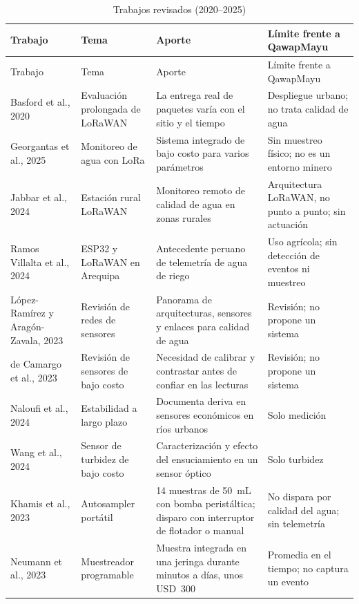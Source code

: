 {\small
\renewcommand{\arraystretch}{1.12}
\begin{longtable}{p{2.6cm} p{3.1cm} p{4.9cm} p{4.6cm}}
\caption{Trabajos revisados (2020--2025)}
\label{tab:eda} \\
\toprule
Trabajo & Tema & Aporte & Límite frente a QawapMayu \\
\midrule
\endfirsthead
\toprule
Trabajo & Tema & Aporte & Límite frente a QawapMayu \\
\midrule
\endhead
Basford et al., 2020~\cite{basford} & Evaluación prolongada de LoRaWAN & La entrega real de paquetes varía con el sitio y el tiempo & Despliegue urbano; no trata calidad de agua \\
Georgantas et al., 2025~\cite{georgantas} & Monitoreo de agua con LoRa & Sistema integrado de bajo costo para varios parámetros & Sin muestreo físico; no es un entorno minero \\
Jabbar et al., 2024~\cite{jabbar} & Estación rural LoRaWAN & Monitoreo remoto de calidad de agua en zonas rurales & Arquitectura LoRaWAN, no punto a punto; sin actuación \\
Ramos Villalta et al., 2024~\cite{ramos} & ESP32 y LoRaWAN en Arequipa & Antecedente peruano de telemetría de agua de riego & Uso agrícola; sin detección de eventos ni muestreo \\
López-Ramírez y Aragón-Zavala, 2023~\cite{lopez2023} & Revisión de redes de sensores & Panorama de arquitecturas, sensores y enlaces para calidad de agua & Revisión; no propone un sistema \\
de Camargo et al., 2023~\cite{camargo} & Revisión de sensores de bajo costo & Necesidad de calibrar y contrastar antes de confiar en las lecturas & Revisión; no propone un sistema \\
Naloufi et al., 2024~\cite{naloufi} & Estabilidad a largo plazo & Documenta deriva en sensores económicos en ríos urbanos & Solo medición \\
Wang et al., 2024~\cite{wang} & Sensor de turbidez de bajo costo & Caracterización y efecto del ensuciamiento en un sensor óptico & Solo turbidez \\
Khamis et al., 2023~\cite{khamis2023} & Autosampler portátil & 14 muestras de 50~mL con bomba peristáltica; disparo con interruptor de flotador o manual & No dispara por calidad del agua; sin telemetría \\
Neumann et al., 2023~\cite{neumann2023} & Muestreador programable & Muestra integrada en una jeringa durante minutos a días, unos USD~300 & Promedia en el tiempo; no captura un evento \\

\end{longtable}}
